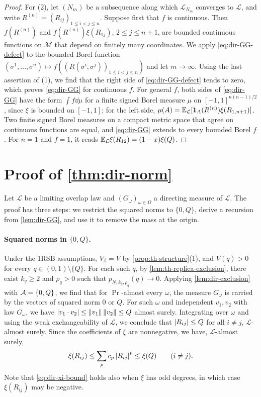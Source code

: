 \begin{proof}
For (2), let $(N_m)$ be a subsequence along which $\mathcal L_{N_m}$ converges to $\mathcal L$, and write $R^{(n)}=(R_{ij})_{1\le i<j\le n}$. Suppose first that $f$ is continuous. Then $f(R^{(n)})$ and $f(R^{(n)})\xi(R_{1j})$, $2\le j\le n+1$, are bounded continuous functions on $\mathcal M$ that depend on finitely many coordinates. We apply \eqref{eq:dir-GG-defect} to the bounded Borel function $(\sigma^1,\dots,\sigma^n)\mapsto f((R(\sigma^i,\sigma^j))_{1\le i<j\le n})$ and let $m\to\infty$. Using the last assertion of (1), we find that the right side of \eqref{eq:dir-GG-defect} tends to zero, which proves \eqref{eq:dir-GG} for continuous $f$. For general $f$, both sides of \eqref{eq:dir-GG} have the form $\int f\dd\mu$ for a finite signed Borel measure $\mu$ on $[-1,1]^{n(n-1)/2}$, since $\xi$ is bounded on $[-1,1]$; for the left side, $\mu(A)=\mathbb E_{\mathcal L}[\mathbf 1_A(R^{(n)})\xi(R_{1,n+1})]$. Two finite signed Borel measures on a compact metric space that agree on continuous functions are equal, and \eqref{eq:dir-GG} extends to every bounded Borel $f$. For $n=1$ and $f=1$, it reads $\mathbb E_{\mathcal L}\xi(R_{12})=(1-x)\xi(Q)$.
\end{proof}

\section{Proof of \texorpdfstring{\cref{thm:dir-norm}}{the theorem on directing norms}}\label{sec:dir-proof}

Let $\mathcal L$ be a limiting overlap law and $(G_\omega)_{\omega\in\Omega}$ a directing measure of $\mathcal L$. The proof has three steps: we restrict the squared norms to $\{0,Q\}$, derive a recursion from \cref{lem:dir-GG}, and use it to remove the mass at the origin.

\paragraph{Squared norms in $\{0,Q\}$.} Under the 1RSB assumptions, $V_\beta=V$ by \cref{prop:th-structure}(1), and $V(q)>0$ for every $q\in(0,1)\setminus\{Q\}$. For each such $q$, by \cref{lem:th-replica-exclusion}, there exist $k_q\ge2$ and $\rho_q>0$ such that $p_{N,k_q,\rho_q}(q)\to0$. Applying \cref{lem:dir-exclusion} with $\mathcal A=\{0,Q\}$, we find that for $\Pr$-almost every $\omega$, the measure $G_\omega$ is carried by the vectors of squared norm $0$ or $Q$. For such $\omega$ and independent $v_1,v_2$ with law $G_\omega$, we have $\left|v_1\cdot v_2\right|\le\left\lVert v_1\right\rVert\left\lVert v_2\right\rVert\le Q$ almost surely. Integrating over $\omega$ and using the weak exchangeability of $\mathcal L$, we conclude that $\left|R_{ij}\right|\le Q$ for all $i\ne j$, $\mathcal L$-almost surely. Since the coefficients of $\xi$ are nonnegative, we have, $\mathcal L$-almost surely,
\begin{equation}\label{eq:dir-xi-bound}
\xi(R_{ij})\le\sum_pc_p\left|R_{ij}\right|^p\le\xi(Q)\qquad(i\ne j).
\end{equation}
Note that \eqref{eq:dir-xi-bound} holds also when $\xi$ has odd degrees, in which case $\xi(R_{ij})$ may be negative.

